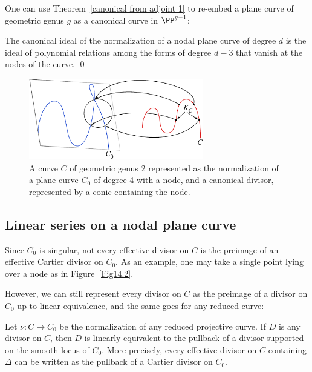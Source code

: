 One can use Theorem~\ref{canonical from adjoint 1} to re-embed a plane
curve of
geometric genus $g$ as a 
canonical curve 
%
in $\PP^{g-1}$:

\begin{corollary}
 The canonical ideal of the normalization of a nodal plane curve of
 degree $d$ is the ideal of polynomial relations
 among the forms of degree $d-3$ that vanish at the nodes of the
 curve. \qed
\end{corollary}

\begin{figure}
\centerline {\includegraphics[width=3in]{"main/Fig14-2"}}
\caption{A curve $C$ of geometric genus 2 represented as the normalization
of a plane curve $C_{0}$ of degree 4 with a node, and a canonical divisor,
represented by a conic containing the node.}
\label{canonical on normalization}
\end{figure}

\subsection{Linear series on a nodal plane curve}
\label{linear series on nodal plane curves}

Since $C_{0}$ is singular, not every 
effective divisor
%
on $C$ is the
%
preimage of an
effective Cartier divisor on $C_{0}$. As an example, one may take a
single point lying over a node
as in Figure~\ref{Fig14.2}.

However,
we can still represent every divisor on $C$ as the preimage of a divisor
on $C_{0}$ up to linear
equivalence, and the same goes for any reduced curve:

\begin{lemma}
Let $\nu: C\to C_{0}$ be the normalization of any reduced projective
%
curve. If $D$ is any divisor
on $C$, then $D$ is linearly equivalent to the pullback of a divisor
supported on the smooth locus of  $C_{0}$. More precisely,  every
effective divisor on $C$ containing $\Delta$ can be written as the
pullback
of a 
Cartier divisor
%
on $C_{0}$.
\unif
\end{lemma}

